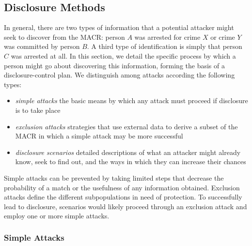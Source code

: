 \documentclass[]{article}
\providecommand{\tightlist}{%
  \setlength{\itemsep}{0pt}\setlength{\parskip}{0pt}}
\begin{document}
\subsection{Disclosure Methods}\label{disclosure-methods}

In general, there are two types of information that a potential attacker
might seek to discover from the MACR: person \(A\) was arrested for
crime \(X\) or crime \(Y\) was committed by person \(B\). A third type
of identification is simply that person \(C\) was arrested at all. In
this section, we detail the specific process by which a person might go
about discovering this information, forming the basis of a
disclosure-control plan. We distinguish among attacks according the
following types:

\begin{itemize}
\tightlist
\item
  \emph{simple attacks} the basic means by which any attack must proceed
  if disclosure is to take place
\item
  \emph{exclusion attacks} strategies that use external data to derive a
  subset of the MACR in which a simple attack may be more successful
\item
  \emph{disclosure scenarios} detailed descriptions of what an attacker
  might already know, seek to find out, and the ways in which they can
  increase their chances
\end{itemize}

Simple attacks can be prevented by taking limited steps that decrease
the probability of a match or the usefulness of any information
obtained. Exclusion attacks define the different subpopulations in need
of protection. To successfully lead to disclosure, scenarios would
likely proceed through an exclusion attack and employ one or more simple
attacks.

\subsubsection{Simple Attacks}\label{simple-attacks}
\end{document}
